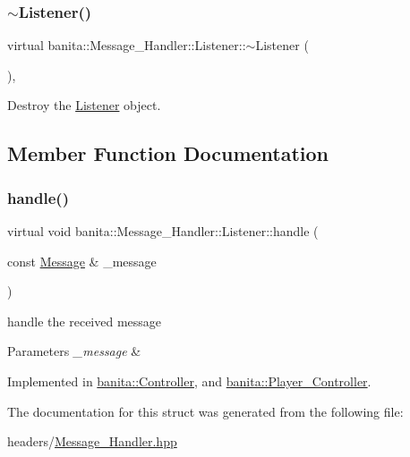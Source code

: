 \subsubsection{\texorpdfstring{$\sim$Listener()}{~Listener()}}
{\footnotesize\ttfamily virtual banita\+::\+Message\+\_\+\+Handler\+::\+Listener\+::$\sim$\+Listener (\begin{DoxyParamCaption}{ }\end{DoxyParamCaption})\hspace{0.3cm}{\ttfamily [inline]}, {\ttfamily [virtual]}}



Destroy the \mbox{\hyperlink{structbanita_1_1_message___handler_1_1_listener}{Listener}} object. 



\subsection{Member Function Documentation}
\mbox{\label{structbanita_1_1_message___handler_1_1_listener_a2dfde040fbc7c8d2f17c6ba52722b749}} 
\subsubsection{\texorpdfstring{handle()}{handle()}}
{\footnotesize\ttfamily virtual void banita\+::\+Message\+\_\+\+Handler\+::\+Listener\+::handle (\begin{DoxyParamCaption}\item[{const \mbox{\hyperlink{classbanita_1_1_message}{Message}} \&}]{\+\_\+message }\end{DoxyParamCaption})\hspace{0.3cm}{\ttfamily [pure virtual]}}



handle the received message 


\begin{DoxyParams}{Parameters}
{\em \+\_\+message} & \\
\hline
\end{DoxyParams}


Implemented in \mbox{\hyperlink{classbanita_1_1_controller_a2feb550d530941ed11312fbbb7730c80}{banita\+::\+Controller}}, and \mbox{\hyperlink{classbanita_1_1_player___controller_a6c6aa3a387d36db7306ca557fbb100e6}{banita\+::\+Player\+\_\+\+Controller}}.



The documentation for this struct was generated from the following file\+:\begin{DoxyCompactItemize}
\item 
headers/\mbox{\hyperlink{_message___handler_8hpp}{Message\+\_\+\+Handler.\+hpp}}\end{DoxyCompactItemize}
